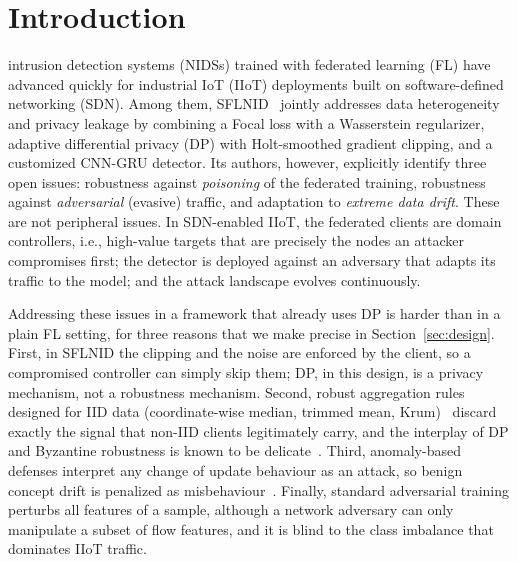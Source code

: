 \documentclass[journal]{IEEEtran}
\begin{document}
\section{Introduction}
 intrusion detection systems (NIDSs) trained with federated learning (FL) have advanced quickly for industrial IoT (IIoT) deployments built on software-defined networking (SDN). Among them, SFLNID~\cite{sflnid} jointly addresses data heterogeneity and privacy leakage by combining a Focal loss with a Wasserstein regularizer, adaptive differential privacy (DP) with Holt-smoothed gradient clipping, and a customized CNN-GRU detector. Its authors, however, explicitly identify three open issues: robustness against \emph{poisoning} of the federated training, robustness against \emph{adversarial} (evasive) traffic, and adaptation to \emph{extreme data drift}. These are not peripheral issues. In SDN-enabled IIoT, the federated clients are domain controllers, i.e., high-value targets that are precisely the nodes an attacker compromises first; the detector is deployed against an adversary that adapts its traffic to the model; and the attack landscape evolves continuously.

Addressing these issues in a framework that already uses DP is harder than in a plain FL setting, for three reasons that we make precise in Section~\ref{sec:design}. First, in SFLNID the clipping and the noise are enforced by the client, so a compromised controller can simply skip them; DP, in this design, is a privacy mechanism, not a robustness mechanism. Second, robust aggregation rules designed for IID data (coordinate-wise median, trimmed mean, Krum)~\cite{krum,yin} discard exactly the signal that non-IID clients legitimately carry, and the interplay of DP and Byzantine robustness is known to be delicate~\cite{zhu_ling}. Third, anomaly-based defenses interpret any change of update behaviour as an attack, so benign concept drift is penalized as misbehaviour~\cite{manias}. Finally, standard adversarial training perturbs all features of a sample, although a network adversary can only manipulate a subset of flow features, and it is blind to the class imbalance that dominates IIoT traffic.
\end{document}
